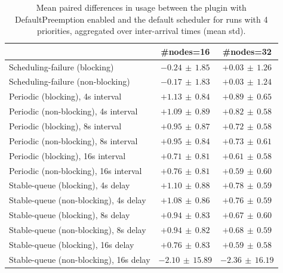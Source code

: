 \begin{table}[t]
\tiny
\setlength{\tabcolsep}{1.2pt}
\renewcommand{\arraystretch}{1.12}
\centering
\caption{Mean paired differences in usage between the plugin with DefaultPreemption enabled and the default scheduler for runs with 4 priorities, aggregated over inter-arrival times (mean \pm std).}
\label{tab:usage-defpreempt1-prio4-std1-agg-arrival}
\begin{tabular}{l c c}
\toprule
 & \#nodes=16 & \#nodes=32 \\
\midrule
Scheduling-failure (blocking) & $-0.24\,\pm\,1.85$ & $+0.03\,\pm\,1.26$ \\
Scheduling-failure (non-blocking) & $-0.17\,\pm\,1.83$ & $+0.03\,\pm\,1.24$ \\
Periodic (blocking), 4s interval & $+1.13\,\pm\,0.84$ & $+0.89\,\pm\,0.65$ \\
Periodic (non-blocking), 4s interval & $+1.09\,\pm\,0.89$ & $+0.82\,\pm\,0.58$ \\
Periodic (blocking), 8s interval & $+0.95\,\pm\,0.87$ & $+0.72\,\pm\,0.58$ \\
Periodic (non-blocking), 8s interval & $+0.95\,\pm\,0.84$ & $+0.73\,\pm\,0.61$ \\
Periodic (blocking), 16s interval & $+0.71\,\pm\,0.81$ & $+0.61\,\pm\,0.58$ \\
Periodic (non-blocking), 16s interval & $+0.76\,\pm\,0.81$ & $+0.59\,\pm\,0.60$ \\
Stable-queue (blocking), 4s delay & $+1.10\,\pm\,0.88$ & $+0.78\,\pm\,0.59$ \\
Stable-queue (non-blocking), 4s delay & $+1.08\,\pm\,0.86$ & $+0.76\,\pm\,0.59$ \\
Stable-queue (blocking), 8s delay & $+0.94\,\pm\,0.83$ & $+0.67\,\pm\,0.60$ \\
Stable-queue (non-blocking), 8s delay & $+0.94\,\pm\,0.82$ & $+0.68\,\pm\,0.59$ \\
Stable-queue (blocking), 16s delay & $+0.76\,\pm\,0.83$ & $+0.59\,\pm\,0.58$ \\
Stable-queue (non-blocking), 16s delay & $-2.10\,\pm\,15.89$ & $-2.36\,\pm\,16.19$ \\
\bottomrule
\end{tabular}
\end{table}
